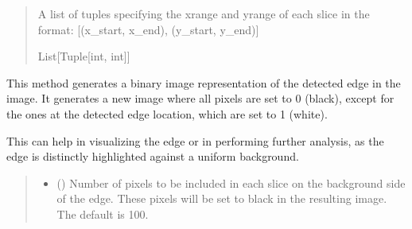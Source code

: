 \documentclass[letterpaper,10pt,english]{sphinxmanual}
\begin{document}
\begin{fulllineitems}
\begin{fulllineitems}
\begin{quote}
\begin{description}
\begin{itemize}
\end{itemize}

\sphinxAtStartPar
A list of tuples specifying the x\sphinxhyphen{}range and y\sphinxhyphen{}range of each slice in the format:
{[}(x\_start, x\_end), (y\_start, y\_end){]}

\sphinxAtStartPar
List{[}Tuple{[}int, int{]}{]}

\end{description}\end{quote}

\end{fulllineitems}


\begin{fulllineitems}
\label{\detokenize{forensicfit.core.tape:forensicfit.core.tape.TapeAnalyzer.get_max_contrast}}
\pysigstartsignatures
{}
\pysigstopsignatures
\sphinxAtStartPar
This method generates a binary image representation of the detected edge in the image.
It generates a new image where all pixels are set to 0 (black), except for the ones
at the detected edge location, which are set to 1 (white).

\sphinxAtStartPar
This can help in visualizing the edge or in performing further analysis, as the edge
is distinctly highlighted against a uniform background.
\begin{quote}\begin{description}
\sphinxAtStartPar
{}

\begin{itemize}
\item {} 
\sphinxAtStartPar
{} (\sphinxstyleliteralemphasis{\sphinxupquote{, }}) \textendash{} Number of pixels to be included in each slice on the background side of the edge.
These pixels will be set to black in the resulting image. The default is 100.


\end{itemize}
\end{description}
\end{quote}
\end{fulllineitems}
\end{fulllineitems}
\end{document}
